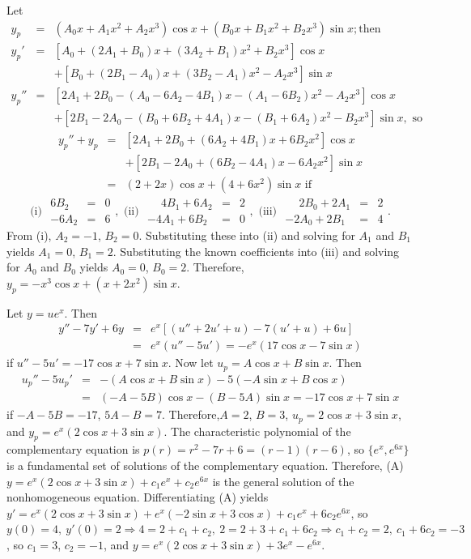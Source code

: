 \documentclass[dvips]{book}
\renewcommand{\exer}[1]{\par\medskip\;\noindent{\color{red}\bf #1.}}
\numberwithin{example}{section}
\numberwithin{equation}{section}
\numberwithin{theorem}{section}
\numberwithin{table}{section}
\numberwithin{figure}{section}
\begin{document}
\exer{5.5.20}
Let
\begin{eqnarray*}
y_p&=&(A_0x+A_1x^2+A_2x^3)\cos x +(B_0x+B_1x^2+B_2x^3)\sin x;\mbox{
then}
\\ y_p'&=&\left[A_0+(2A_1+B_0)x+(3A_2+B_1)x^2+B_2x^3\right]\cos x\\ &&
+\left[B_0+(2B_1-A_0)x+(3B_2-A_1)x^2-A_2x^3\right]\sin x\\
y_p''&=&\left[2A_1+2B_0-(A_0-6A_2-4B_1)x-(A_1-6B_2)x^2-A_2x^3\right]\cos x\\ &&+
\left[2B_1-2A_0-(B_0+6B_2+4A_1)x-(B_1+6A_2)x^2-B_2x^3\right]\sin x, \mbox{ so}
\end{eqnarray*}
\begin{eqnarray*}
y_p''+y_p&=&\left[2A_1+2B_0+(6A_2+4B_1)x+6B_2x^2\right]\cos x\\ && +
\left[2B_1-2A_0+(6B_2-4A_1)x-6A_2x^2\right]\sin x\\
&=&(2+2x)\cos x+(4+6x^2)\sin x \mbox{ if}
\end{eqnarray*}
$$
\mbox{(i) } \begin{array}{rcl} 6B_2&=&0\\-6A_2&=&6\end{array},
\mbox{ (ii) } \begin{array}{rcr}\phantom{-}4B_1+6A_2&=&2
\\-4A_1+6B_2&=&0\end{array},
\mbox{ (iii) } \begin{array}{rcl}\phantom{-}2B_0+2A_1&=&2
\\-2A_0+2B_1&=&4\end{array}.
$$
From (i), $A_2=-1$, $B_2=0$. Substituting these into (ii) and solving
for $A_1$ and $B_1$ yields $A_1=0$, $B_1=2$. Substituting the known
coefficients into (iii) and solving for $A_0$ and $B_0$ yields
$A_0=0$, $B_0=2$. Therefore,$y_p=-x^3\cos x+(x+2x^2)\sin x$.




\exer{5.5.22}
Let $y=ue^x$. Then
\begin{eqnarray*}
y''-7y'+6y&=&e^x\left[(u''+2u'+u)-7(u'+u)+6u\right]\\ &=&e^x(u''-5u')=
-e^x(17\cos x-7\sin x)
\end{eqnarray*}
 if $u''-5u'=-17\cos x+7\sin x$.
Now let  $u_p=A\cos x+B\sin x$. Then
\begin{eqnarray*}
u_p''-5u_p'&=&-(A\cos x+B\sin x)-5(-A\sin x+B\cos x)\\
&=& (-A-5B)\cos x-(B-5A)\sin x=-17\cos x+7\sin x
\end{eqnarray*}
if $-A-5B=-17$, $5A-B=7$. Therefore,$A=2$, $B=3$, $u_p=2\cos x+3\sin
x$, and $y_p=e^x(2\cos x+3\sin x)$. The characteristic polynomial of
the complementary equation is $p(r)=r^2-7r+6=(r-1)(r-6)$, so
$\{e^x,e^{6x}\}$ is a fundamental set of solutions of the
complementary equation. Therefore,
(A) $y=e^x(2\cos x+3\sin x)+c_1e^x+c_2e^{6x}$
is the general solution of the nonhomogeneous
equation. Differentiating (A) yields
$y'=e^x(2\cos x+3\sin x)+e^x(-2\sin x+3\cos x)+c_1e^x+6c_2e^{6x}$,
so $y(0)=4,\ y'(0)=2\Rightarrow 4=2+c_1+c_2,\
2=2+3+c_1+6c_2\Rightarrow c_1+c_2=2,\ c_1+6c_2=-3$, so $c_1=3$,
$c_2=-1$, and
 $y=e^x(2\cos x+3\sin x)+3e^x-e^{6x}$.
\end{document}
